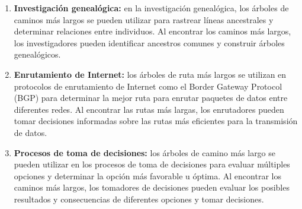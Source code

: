 \begin{enumerate}
	\item \textbf{Investigación genealógica:} en la investigación genealógica, los árboles de caminos más largos se pueden utilizar para rastrear líneas ancestrales y determinar relaciones entre individuos. Al encontrar los caminos más largos, los investigadores pueden identificar ancestros comunes y construir árboles genealógicos.
	\item \textbf{ Enrutamiento de Internet:} los árboles de ruta más largos se utilizan en protocolos de enrutamiento de Internet como el Border Gateway Protocol (BGP) para determinar la mejor ruta para enrutar paquetes de datos entre diferentes redes. Al encontrar las rutas más largas, los enrutadores pueden tomar decisiones informadas sobre las rutas más eficientes para la transmisión de datos.
	\item \textbf{Procesos de toma de decisiones:} los árboles de camino más largo se pueden utilizar en los procesos de toma de decisiones para evaluar múltiples opciones y determinar la opción más favorable u óptima. Al encontrar los caminos más largos, los tomadores de decisiones pueden evaluar los posibles resultados y consecuencias de diferentes opciones y tomar decisiones.
\end{enumerate}
